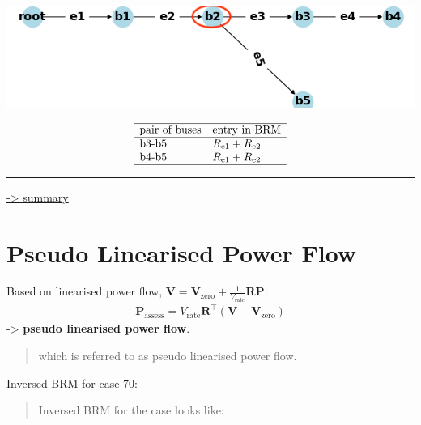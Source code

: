 \documentclass[
]{book}
\begin{document}
\begin{center}\includegraphics[width=0.7\linewidth]{Pictures/figCaseSix} \end{center}

\[ \begin{array}{ll}
  \hline
  \text{pair of buses} & \text{entry in BRM} \\
  \hline
  \text{b3-b5} & R_\text{e1} + R_\text{e2} \\
  \text{b4-b5} & R_\text{e1} + R_\text{e2} \\
  \hline
\end{array} \]

\begin{center}\rule{0.5\linewidth}{0.5pt}\end{center}

\protect\hyperlink{summary}{-\textgreater{} summary}

\hypertarget{brmInv}{%
\section{Pseudo Linearised Power Flow}\label{brmInv}}

Based on linearised power flow, \(\boldsymbol{V} = \boldsymbol{V}_\text{zero} + \frac{1}{V_\text{rate}} \boldsymbol{R} \boldsymbol{P}\):
\[ \begin{aligned}
    \boldsymbol{P}_\text{assess} =
    V_\text{rate} \boldsymbol{R}^{\top}
    \left( \boldsymbol{V} - \boldsymbol{V}_\text{zero} \right)
\end{aligned} \]
-\textgreater{} \textbf{pseudo linearised power flow}.

\begin{quote}
which is referred to as pseudo linearised power flow.
\end{quote}

Inversed BRM for case-70:

\begin{quote}
Inversed BRM for the case looks like:
\end{quote}
\end{document}
